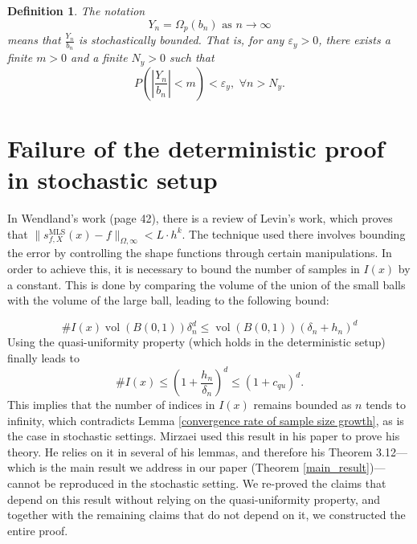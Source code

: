 \documentclass{article}
\newtheorem{definition}
{Definition}
\newcommand{\mlsfun}[1]{s^\text{MLS}_{f,X}(#1)}
\begin{document}
\begin{definition}
    The notation 
    \begin{equation*}
        Y_n=\Omega_p\left(b_n\right) \text { as } n \rightarrow \infty
    \end{equation*}
        means that $\frac{Y_n}{b_n}$ is stochastically  bounded. That is, for any ${\varepsilon_y} > 0$, there exists a finite $m > 0$ and a finite $N_y > 0$ such that
        \begin{equation*}
         P\left(\left|\frac{Y_n}{b_n}\right|<m\right)<{\varepsilon_y},\,\, \forall n>N_y.
        \end{equation*}
        \label{def_of_Omega_p}
    \end{definition} 

\section{Failure of the deterministic proof in stochastic setup} \label{Failure of the deterministic - Wendland}

In Wendland's work \cite{wendland2005scattered} (page 42), there is a review of Levin's work, which proves that  $\|\mlsfun{x}-f\|_{\Omega, \infty}<L \cdot h^{k} $. The technique used there involves bounding the error by controlling the shape functions through certain manipulations. In order to achieve this, it is necessary to bound the number of samples in \( I(x) \) by a constant. This is done by comparing the volume of the union of the small balls with the volume of the large ball, leading to the following bound:

\begin{equation}
    \# I(x) \operatorname{vol}(B(0,1)) \delta_n^d \leq \operatorname{vol}(B(0,1))(\delta_n+h_n)^d
\end{equation}
Using the quasi-uniformity property (which holds in the deterministic setup) finally leads to
\begin{equation}
    \# I(x) \leq\left(1+\frac{h_n}{\delta_n}\right)^d \leq\left(1+c_{qu}\right)^d.
\end{equation}
This implies that the number of indices in \( I(x) \) remains bounded as \( n \) tends to infinity, which contradicts Lemma  \ref{convergence rate of sample size growth}, as is the case in stochastic settings. Mirzaei used this result in his paper to prove his theory. He relies on it in several of his lemmas, and therefore his Theorem 3.12—which is the main result we address in our paper (Theorem \ref{main_result})—cannot be reproduced in the stochastic setting. We re-proved the claims that depend on this result without relying on the quasi-uniformity property, and together with the remaining claims that do not depend on it, we constructed the entire proof.
\end{document}
